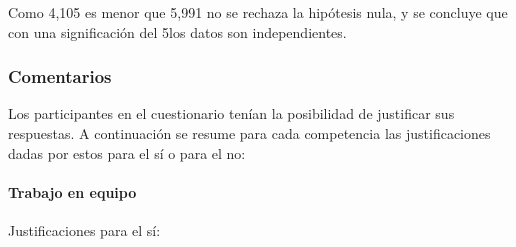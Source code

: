 \begin{center}
\end{center}

Como 4,105 es menor que 5,991 no se rechaza la hipótesis nula, y se concluye que con una significación del 5\percentage los datos son independientes.

\begin{center}
\end{center}
 
\subsubsection{Comentarios} \label{ape:cuestionario:comentarios}

Los participantes en el cuestionario tenían la posibilidad de justificar sus respuestas. A continuación se resume para cada competencia las justificaciones dadas por estos para el sí o para el no:

\paragraph*{Trabajo en equipo}

Justificaciones para el sí:

